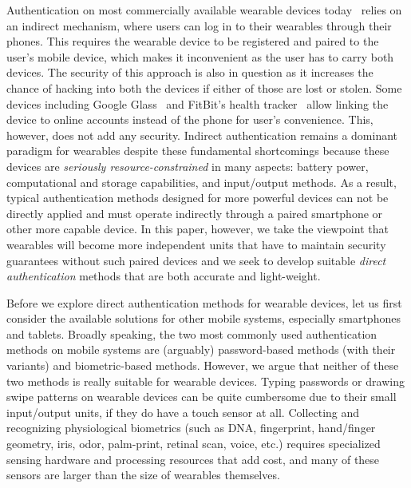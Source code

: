 \vspace{1mm}
Authentication on most commercially available wearable devices 
today~\cite{fitbit, smartwatch} relies on an indirect mechanism, where users 
can log in to their wearables through their phones. This requires the wearable 
device to be registered and paired to the user's mobile device, which makes it 
inconvenient as the user has to carry both devices. The security of this 
approach is also in question as it increases the chance of hacking into both 
the devices if either of those are lost or stolen. Some devices including 
Google Glass~\cite{googleglass} and FitBit's health tracker~\cite{fitbit} 
allow linking the device to online accounts instead of the phone for user's 
convenience. This, however, does not add any security. Indirect authentication 
remains a 
dominant paradigm for wearables despite these fundamental shortcomings because 
these devices are \emph{seriously resource-constrained} in many aspects: 
battery power, computational and storage capabilities, and input/output 
methods. As a result, typical authentication methods designed for more 
powerful devices can not be directly applied and must operate indirectly 
through a paired smartphone or other more capable device. In this paper, 
however, we take the viewpoint that wearables will become more independent 
units that have to maintain security guarantees without such paired devices 
and we seek to develop suitable \emph{direct authentication} methods that are 
both accurate and light-weight.

Before we explore direct authentication methods for wearable devices, let us 
first consider the available solutions for other mobile systems, especially 
smartphones and tablets. Broadly speaking, the two most commonly used 
authentication methods on mobile systems are (arguably) password-based methods 
(with their variants) and biometric-based methods. However, we argue that 
neither of these two methods is really suitable for wearable devices. Typing 
passwords or drawing swipe patterns on wearable devices can be quite 
cumbersome due to their small input/output units, if they do have a touch 
sensor at all. Collecting and recognizing physiological biometrics (such as 
DNA, fingerprint, hand/finger geometry, iris, odor, palm-print, retinal scan, 
voice, etc.) requires specialized sensing hardware and processing resources 
that add cost, and many of these sensors are larger than the size of wearables 
themselves.

